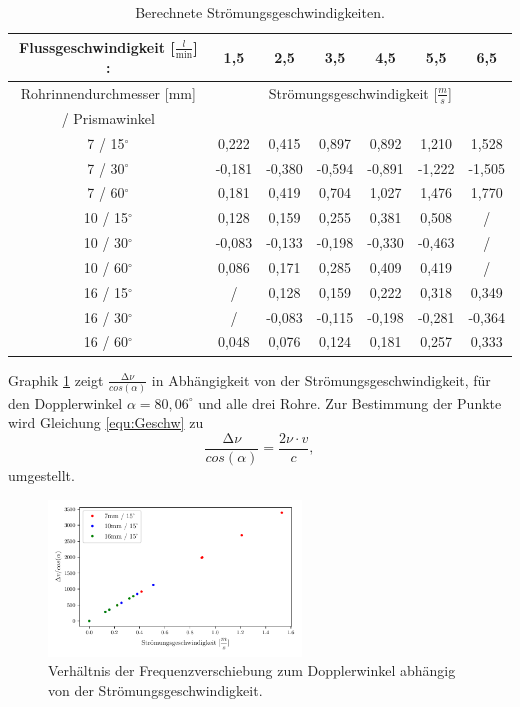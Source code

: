 \begin{table}
    \centering
    \caption{Berechnete Strömungsgeschwindigkeiten.}
    \label{tab:Geschw}

    \begin{tabular}{c | c c c c c c}
        \toprule
        Flussgeschwindigkeit [$\frac{l}{\text{min}}$] :& 1,5 & 2,5 & 3,5 & 4,5 & 5,5 & 6,5 \\ 
        \midrule
        Rohrinnendurchmesser [mm]   & \multicolumn{6}{c}{Strömungsgeschwindigkeit [$\frac{m}{s}$]} \\
        / Prismawinkel & & & & & & \\
        \midrule
        7 / 15$^{\circ}$  & 0,222 & 0,415 & 0,897 & 0,892 & 1,210 & 1,528 \\
        7 / 30$^{\circ}$  &-0,181 &-0,380 &-0,594 &-0,891 &-1,222 &-1,505 \\
        7 / 60$^{\circ}$  & 0,181 & 0,419 & 0,704 & 1,027 & 1,476 & 1,770 \\
        10 / 15$^{\circ}$ & 0,128 & 0,159 & 0,255 & 0,381 & 0,508 & /     \\
        10 / 30$^{\circ}$ &-0,083 &-0,133 &-0,198 &-0,330 &-0,463 & /     \\
        10 / 60$^{\circ}$ & 0,086 & 0,171 & 0,285 & 0,409 & 0,419 & /     \\
        16 / 15$^{\circ}$ &  /    & 0,128 & 0,159 & 0,222 & 0,318 & 0,349 \\
        16 / 30$^{\circ}$ &  /    &-0,083 &-0,115 &-0,198 &-0,281 &-0,364 \\
        16 / 60$^{\circ}$ & 0,048 & 0,076 & 0,124 & 0,181 & 0,257 & 0,333 \\
        \bottomrule
    \end{tabular}
\end{table}

Graphik \ref{fig:KeineAhnung} zeigt $\frac{\increment \nu}{cos(\alpha)}$ in Abhängigkeit von der Strömungsgeschwindigkeit, für den Dopplerwinkel 
$\alpha = 80,06^{\circ}$ und alle drei Rohre.
Zur Bestimmung der Punkte wird Gleichung \eqref{equ:Geschw} zu 
\begin{equation}
    \frac{\increment \nu}{cos(\alpha)} = \frac{2\nu \cdot v}{c},
\end{equation}
umgestellt.

\begin{figure}
    \centering
    \includegraphics[width = 0.60\textwidth]{plot1.pdf}
    \caption{Verhältnis der Frequenzverschiebung zum Dopplerwinkel abhängig von der Strömungsgeschwindigkeit.}
    \label{fig:KeineAhnung}
\end{figure}

